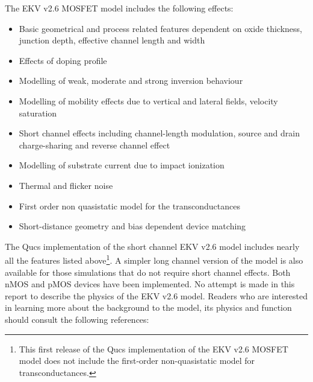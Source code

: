 The EKV v2.6 MOSFET model includes the following effects:
\begin{itemize}
 \item Basic geometrical and process related features dependent on oxide thickness, junction depth, effective channel length and width
 \item Effects of doping profile
 \item Modelling of weak, moderate and strong inversion behaviour
 \item Modelling of mobility effects due to vertical and lateral fields, velocity saturation
 \item Short channel effects including channel-length modulation, source and drain charge-sharing and reverse channel effect
 \item Modelling of substrate current due to impact ionization
 \item Thermal and flicker noise
 \item First order non quasistatic model for the transconductances
 \item Short-distance geometry and bias dependent device matching
\end{itemize}

The Qucs implementation of the short channel EKV v2.6 model includes
nearly all the features listed above\footnote{This first release of
the Qucs implementation of the EKV v2.6 MOSFET model does not include
the first-order non-quasistatic model for transconductances.}. A
simpler long channel version of the model is also available for those
simulations that do not require short channel effects.  Both nMOS and
pMOS devices have been implemented. No attempt is made in this report
to describe the physics of the EKV v2.6 model. Readers who are
interested in learning more about the background to the model, its
physics and function should consult the following references:

